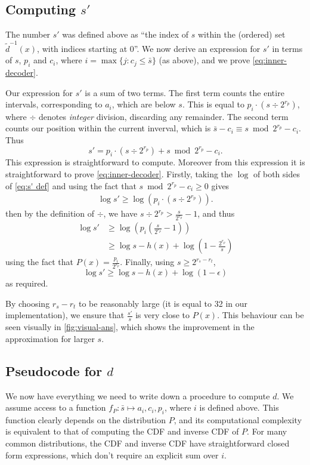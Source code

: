 \documentclass{article}
\theoremstyle{definition}
\begin{document}
\subsection{Computing \(s'\)}
The number \(s'\) was defined above as ``the index of \(s\) within the
(ordered) set \(\tilde d^{-1}(x)\), with indices starting at \(0\)''. We now
derive an expression for \(s'\) in terms of \(s\), \(p_i\) and \(c_i\), where
\(i = \max\{j: c_j \leq \bar s\}\) (as above), and we prove
\cref{eq:inner-decoder}.

Our expression for \(s'\) is a sum of two terms. The first term counts the
entire intervals, corresponding to \(a_i\), which are below \(s\). This is
equal to \(p_i \cdot (s \div 2^{r_p})\), where \(\div\) denotes \emph{integer}
division, discarding any remainder. The second term counts our position within
the current inverval, which is \(\bar s - c_i \equiv s\bmod 2^{r_p} - c_i\).
Thus
\begin{equation}\label{eq:s' def}
  s' = p_i \cdot (s \div 2^{r_p}) + s\bmod 2^{r_p} - c_i.
\end{equation}
This expression is straightforward to compute. Moreover from this expression it
is straightforward to prove \cref{eq:inner-decoder}. Firstly, taking the
\(\log\) of both sides of \cref{eq:s' def} and using the fact that \(s\bmod
2^{r_p} - c_i \geq 0\) gives
\begin{align}
  \log s' \geq \log (p_i\cdot (s\div 2^{r_p})).
\end{align}
then by the definition of \(\div\), we have \(s\div 2^{r_p} > \frac{s}{2^{r_p}}
- 1\), and thus
\begin{align}
  \log s'
    &\geq \log\left(p_i\left(\frac{s}{2^{r_p}} -1\right)\right)\\
    &\geq \log s - h(x) + \log\left(1 - \frac{2^{r_p}}{s}\right)
\end{align}
using the fact that \(P(x) = \frac{p_i}{2^{r_p}}\). Finally, using \(s \geq
2^{r_s - r_t}\),
\begin{equation}
  \log s' \geq \log s - h(x) + \log (1 - \epsilon)
\end{equation}
as required.

By choosing \(r_s - r_t\) to be reasonably
large (it is equal to 32 in our implementation), we ensure that
\(\frac{s'}{s}\) is very close to \(P(x)\). This behaviour can be seen visually
in \cref{fig:visual-ans}, which shows the improvement in the approximation for
larger \(s\).

\subsection{Pseudocode for \(d\)}
We now have everything we need to write down a procedure to compute \(d\). We
assume access to a function \(f_P:\bar{s}\mapsto a_i, c_i, p_i\), where \(i\)
is defined above. This function clearly depends on the distribution \(P\), and
its computational complexity is equivalent to that of computing the CDF and
inverse CDF of \(P\). For many common distributions, the CDF and inverse CDF
have straightforward closed form expressions, which don't require an explicit
sum over \(i\).
\end{document}
